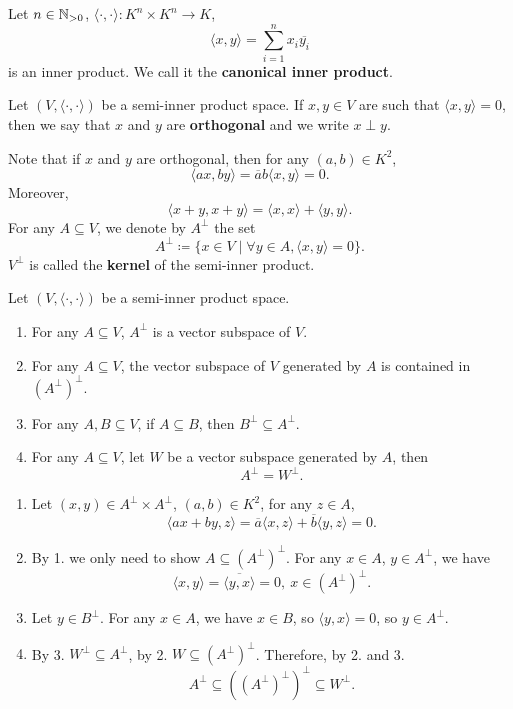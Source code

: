 \begin{exampleenv}
    Let $n\in \mathbb{N}_{> 0}$, $\langle \cdot ,\cdot\rangle : K^n \times K^n \rightarrow K$,
    $$ \langle x,y\rangle = \sum_{i=1}^{n} x_i \overline{y_i}$$
    is an inner product. We call it the \textbf{canonical inner product}.
\end{exampleenv}
\begin{definitionenv}
    Let $\left(V,\langle \cdot ,\cdot\rangle\right)$ be a semi-inner product space. If $x,y\in V$ are such that $\langle x,y\rangle =0$, then we say that $x$ and $y$ are \textbf{orthogonal} and we write $x\perp y$.

    \quad Note that if $x$ and $y$ are orthogonal, then for any $(a,b)\in K^2$, 
    $$ \langle ax , by\rangle = \overline{a}b \langle x, y\rangle =0.$$
    Moreover, 
    $$ \langle x+y, x+y \rangle = \langle x,x \rangle + \langle y,y\rangle.$$
    For any $A\subseteq V$, we denote by $A^\perp$ the set
    $$ A^\perp \coloneq \{x\in V\mid \forall y\in A, \langle x,y\rangle =0 \}.$$
    $V^\perp$ is called the \textbf{kernel} of the semi-inner product.
\end{definitionenv}
\begin{propositionenv}\label{3.1.5}
    Let $\left(V, \langle \cdot, \cdot\rangle\right)$ be a semi-inner product space.
    \begin{enumerate}
        \item For any $A\subseteq V$, $A^\perp$ is a vector subspace of $V$.
        \item For any $A\subseteq V$, the vector subspace of $V$ generated by $A$ is contained in $\left(A^\perp\right)^\perp$.
        \item For any $A,B\subseteq V$, if $A\subseteq B$, then $B^\perp \subseteq A^\perp$.
        \item For any $A\subseteq V$, let $W$ be a vector subspace generated by $A$, then $$A^\perp = W^\perp.$$
    \end{enumerate}
\end{propositionenv}
\begin{proofenv}
    \quad 
    \begin{enumerate}
        \item Let $(x,y)\in A^\perp\times A^\perp$, $(a,b) \in K^2$, for any $z\in A$, $$ \langle ax + by, z \rangle = \overline{a} \langle x,z\rangle + \overline{b} \langle y,z\rangle =0.$$
        \item By 1. we only need to show $A\subseteq \left(A^\perp\right)^\perp$. For any $x\in A$, $y\in A^\perp$, we have $$ \langle x,y\rangle = \overline{\langle y , x\rangle} = 0,\ x\in \left(A^\perp\right)^\perp.$$
        \item Let $y\in B^\perp$. For any $x\in A$, we have $x\in B$, so $\langle y, x\rangle =0$, so $y\in A^\perp$.
        \item By 3. $W^\perp \subseteq A^\perp$, by 2. $W\subseteq \left(A^\perp\right)^\perp$. Therefore, by 2. and 3. $$ A^\perp \subseteq \left(\left(A^\perp\right)^\perp\right)^\perp \subseteq W^\perp.$$
    \end{enumerate}
\end{proofenv}
